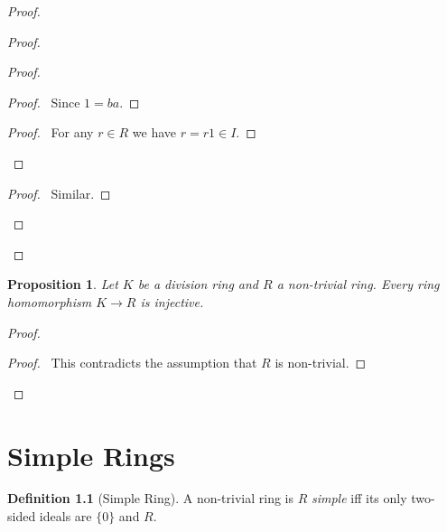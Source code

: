 \documentclass{book}
\let\qed\relax
\newtheorem{prop}{Proposition}[chapter]
\theoremstyle{definition}
\newtheorem{df}[prop]{Definition}
\newcommand{\inv}[1]{\ensuremath{{#1}^{-1}}}
\begin{document}
\begin{proof}
\pf
{}
\begin{proof}
	\begin{proof}
		\begin{proof}
			\pf\ Since $1 = ba$.
		\end{proof}
		\begin{proof}
			\pf\ For any $r \in R$ we have $r = r1 \in I$.
		\end{proof}
	\end{proof}
	\begin{proof}
		\pf\ Similar.
	\end{proof}
\end{proof}
\qed
\end{proof}

\begin{prop}
Let $K$ be a division ring and $R$ a non-trivial ring. Every ring homomorphism $K \rightarrow R$ is injective.
\end{prop}

\begin{proof}
\pf
{}
\step{4}{$\phi(x \inv{x}) = 1$}
\qedstep
\begin{proof}
\pf\ This contradicts the assumption that $R$ is non-trivial.
\end{proof}
\qed
\end{proof}

\chapter{Simple Rings}

\begin{df}[Simple Ring]
A non-trivial ring is $R$ \emph{simple} iff its only two-sided ideals are $\{0\}$ and $R$.
\end{df}
\end{document}

